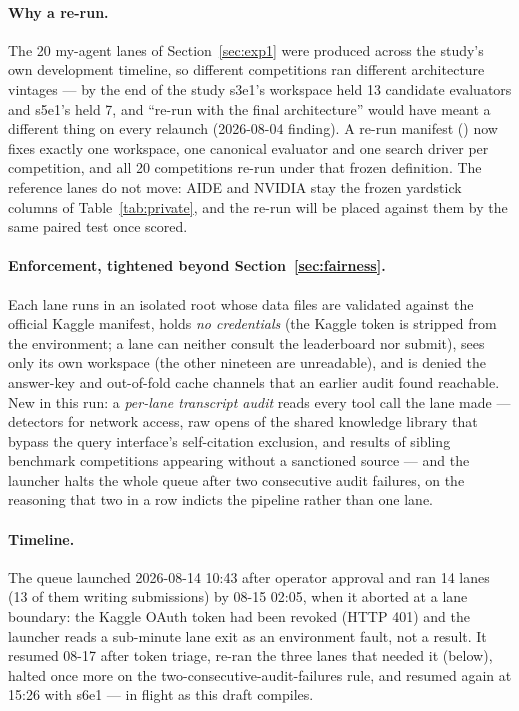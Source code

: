 \documentclass[11pt,a4paper]{article}
\begin{document}
\paragraph{Why a re-run.} The 20 my-agent lanes of Section~\ref{sec:exp1} were produced across the study's own development timeline, so different competitions ran different architecture vintages --- by the end of the study s3e1's workspace held 13 candidate evaluators and s5e1's held 7, and ``re-run with the final architecture'' would have meant a different thing on every relaunch (2026-08-04 finding). A re-run manifest () now fixes exactly one workspace, one canonical evaluator and one search driver per competition, and all 20 competitions re-run under that frozen definition. The reference lanes do not move: AIDE and NVIDIA stay the frozen yardstick columns of Table~\ref{tab:private}, and the re-run will be placed against them by the same paired test once scored.

\paragraph{Enforcement, tightened beyond Section~\ref{sec:fairness}.} Each lane runs in an isolated root whose data files are validated against the official Kaggle manifest, holds \emph{no credentials} (the Kaggle token is stripped from the environment; a lane can neither consult the leaderboard nor submit), sees only its own workspace (the other nineteen are unreadable), and is denied the answer-key and out-of-fold cache channels that an earlier audit found reachable. New in this run: a \emph{per-lane transcript audit} reads every tool call the lane made --- detectors for network access, raw opens of the shared knowledge library that bypass the query interface's self-citation exclusion, and results of sibling benchmark competitions appearing without a sanctioned source --- and the launcher halts the whole queue after two consecutive audit failures, on the reasoning that two in a row indicts the pipeline rather than one lane.

\paragraph{Timeline.} The queue launched 2026-08-14 10:43 after operator approval and ran 14 lanes (13 of them writing submissions) by 08-15 02:05, when it aborted at a lane boundary: the Kaggle OAuth token had been revoked (HTTP 401) and the launcher reads a sub-minute lane exit as an environment fault, not a result. It resumed 08-17 after token triage, re-ran the three lanes that needed it (below), halted once more on the two-consecutive-audit-failures rule, and resumed again at 15:26 with s6e1 --- in flight as this draft compiles.
\end{document}
